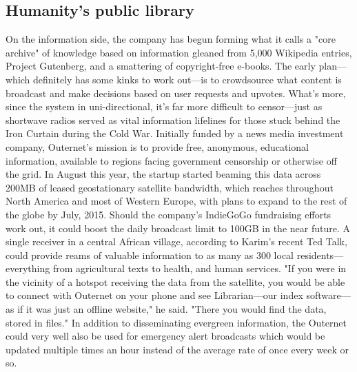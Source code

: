 \documentclass[10pt,conference,a4paper]{IEEEtran}%
\begin{document}
\subsection{Humanity's public library}
On the information side, the company has begun forming what it calls a "core archive" of knowledge based on information gleaned from 5,000 Wikipedia entries, Project Gutenberg, and a smattering of copyright-free e-books. The early plan—which definitely has some kinks to work out—is to crowdsource what content is broadcast and make decisions based on user requests and upvotes.
What's more, since the system in uni-directional, it's far more difficult to censor—just as shortwave radios served as vital information lifelines for those stuck behind the Iron Curtain during the Cold War. Initially funded by a news media investment company, Outernet's mission is to provide free, anonymous, educational information, available to regions facing government censorship or otherwise off the grid.
In August this year, the startup started beaming this data across 200MB of leased geostationary satellite bandwidth, which reaches throughout North America and most of Western Europe, with plans to expand to the rest of the globe by July, 2015. Should the company's IndieGoGo fundraising efforts work out, it could boost the daily broadcast limit to 100GB in the near future.
A single receiver in a central African village, according to Karim's recent Ted Talk, could provide reams of valuable information to as many as 300 local residents—everything from agricultural texts to health, and human services. "If you were in the vicinity of a hotspot receiving the data from the satellite, you would be able to connect with Outernet on your phone and see Librarian—our index software—as if it was just an offline website," he said. "There you would find the data, stored in files."
In addition to disseminating evergreen information, the Outernet could very well also be used for emergency alert broadcasts which would be updated multiple times an hour instead of the average rate of once every week or so.
\end{document}
